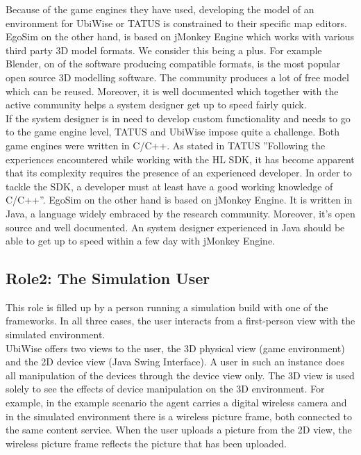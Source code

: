 
Because of the game engines they have used, developing the model of an environment for UbiWise or TATUS is constrained to their specific map editors. EgoSim on the other hand, is based on jMonkey Engine which works with various third party 3D model formats. We consider this being a plus. For example Blender, on of the software producing compatible formats, is the most popular open source 3D modelling software. The community produces a lot of free model which can be reused. Moreover, it is well documented which together with the active community helps a system designer get up to speed fairly quick.\\

If the system designer is in need to develop custom functionality and needs to go to the game engine level, TATUS and UbiWise impose quite a challenge. Both game engines were written in C/C++. As stated in TATUS ''Following the experiences encountered while working with the HL SDK, it has become apparent that its complexity requires the presence of an experienced developer. In order to tackle the SDK, a developer must at least have a good working knowledge of C/C++''. EgoSim on the other hand is based on jMonkey Engine. It is written in Java, a language widely embraced by the research community. Moreover, it's open source and well documented. An system designer experienced in Java should be able to get up to speed within a few day with jMonkey Engine.\\

\subsection{Role2: The Simulation User} %
\label{subsec:eval_role_simulation_user}
This role is filled up by a person running a simulation build with one of the frameworks. In all three cases, the user interacts from a first-person view with the simulated environment.\\

UbiWise offers two views to the user, the 3D physical view (game environment) and the 2D device view (Java Swing Interface). A user in such an instance does all manipulation of the devices through the device view only. The 3D view is used solely to see the effects of device manipulation on the 3D environment. For example, in the example scenario the agent carries a digital wireless camera and in the simulated environment there is a wireless picture frame, both connected to the same content service. When the user uploads a picture from the 2D view, the wireless picture frame reflects the picture that has been uploaded.\\

